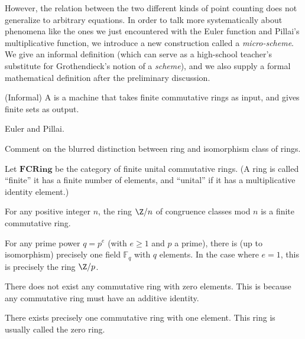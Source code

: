 \documentclass[a4paper]{article}
\begin{document}
However, the relation between the two different kinds of point counting does not generalize to arbitrary equations. In order to talk more systematically about phenomena like the ones we just encountered with the Euler function and Pillai's multiplicative function, we introduce a new construction called a \emph{micro-scheme}. We give an informal definition (which can serve as a high-school teacher's substitute for Grothendieck's notion of a \emph{scheme}), and we also supply a formal mathematical definition after the preliminary discussion.

\begin{definition}
(Informal) A  is a machine that takes finite commutative rings as input, and gives finite sets as output.
\end{definition}

\begin{example}
Euler and Pillai.
\end{example}




Comment on the blurred distinction between ring and isomorphism class of rings.

\begin{definition}
Let $\mathbf{FCRing}$ be the category of finite unital commutative rings. (A ring is called ``finite'' it has a finite number of elements, and ``unital'' if it has a multiplicative identity element.)
\end{definition}

\begin{example}
For any positive integer $n$, the ring $\Z / n$ of congruence classes mod $n$ is a finite commutative ring.
\end{example}

\begin{example}
For any prime power $q = p^e$ (with $e \geq 1$ and $p$ a prime), there is (up to isomorphism) precisely one field $\mathbb{F}_q$ with $q$ elements. In the case where $e=1$, this is precisely the ring $\Z / p$.
\end{example}

\begin{example}
There does not exist any commutative ring with zero elements. This is because any commutative ring must have an additive identity.
\end{example}

\begin{example}
There exists precisely one commutative ring with one element. This ring is usually called the zero ring.
\end{example}
\end{document}
